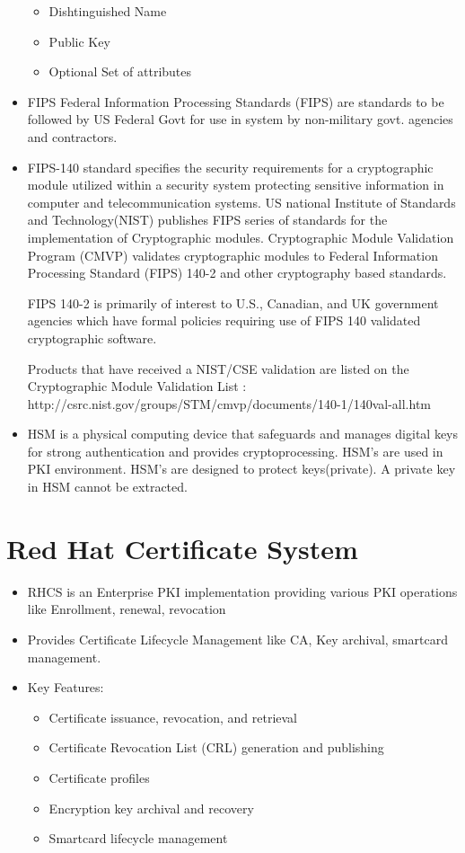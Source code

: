 \documentclass[a4paper]{article}
\begin{document}
\begin{itemize}
\begin{itemize}
            \item Dishtinguished Name
            \item Public Key
            \item Optional Set of attributes
        \end{itemize}
    \item FIPS
        Federal Information Processing Standards (FIPS) are standards to be followed by US Federal Govt for use in system by non-military govt. agencies and contractors.  
    \item FIPS-140
        standard specifies the security requirements for a cryptographic module utilized within a security system protecting sensitive information in computer and telecommunication systems. US national Institute of Standards and Technology(NIST) publishes FIPS series of standards for the implementation of Cryptographic modules. Cryptographic Module Validation Program (CMVP) validates cryptographic modules to Federal Information Processing Standard (FIPS) 140-2 and other cryptography based standards. 

        FIPS 140-2 is primarily of interest to U.S., Canadian, and UK government agencies which have formal policies requiring use of FIPS 140 validated cryptographic software. ~\cite{nist:fips}

        Products that have received a NIST/CSE validation are listed on the Cryptographic Module Validation List : http://csrc.nist.gov/groups/STM/cmvp/documents/140-1/140val-all.htm
    \item HSM
        is a physical computing device that safeguards and manages digital keys for strong authentication and provides cryptoprocessing. HSM's are used in PKI environment. HSM's are designed to protect keys(private). A private key in HSM cannot be extracted.     
\end{itemize}
\section{Red Hat Certificate System}
    \begin{itemize}
        \item RHCS is an Enterprise PKI implementation providing various PKI operations like Enrollment, renewal, revocation
        \item Provides Certificate Lifecycle Management  like CA, Key archival, smartcard management. 
        \item Key Features:
            \begin{itemize}
                \item Certificate issuance, revocation, and retrieval 
                \item Certificate Revocation List (CRL) generation and publishing
                \item Certificate profiles
                \item Encryption key archival and recovery 
                \item Smartcard lifecycle management 
            \end{itemize}
    \end{itemize}
\end{document}
